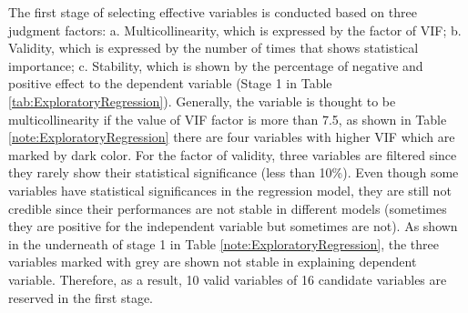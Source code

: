 \documentclass[utf8]{article}
\begin{document}
The first stage of selecting effective variables is conducted based on three judgment factors: a. Multicollinearity, which is expressed by the factor of VIF; b. Validity, which is expressed by the number of times that shows statistical importance; c. Stability, which is shown by the percentage of negative and positive effect to the dependent variable (Stage 1 in Table \ref{tab:ExploratoryRegression}). Generally, the variable is thought to be multicollinearity if the value of VIF factor is more than 7.5, as shown in Table \ref{note:ExploratoryRegression} there are four variables with higher VIF which are marked by dark color. For the factor of validity, three variables are filtered since they rarely show their statistical significance (less than 10\%). Even though some variables have statistical significances in the regression model, they are still not credible since their performances are not stable in different models (sometimes they are positive for the independent variable but sometimes are not). As shown in the underneath of stage 1 in Table \ref{note:ExploratoryRegression}, the three variables marked with grey are shown not stable in explaining dependent variable. Therefore, as a result, 10 valid variables of 16 candidate variables are reserved in the first stage.
\end{document}
